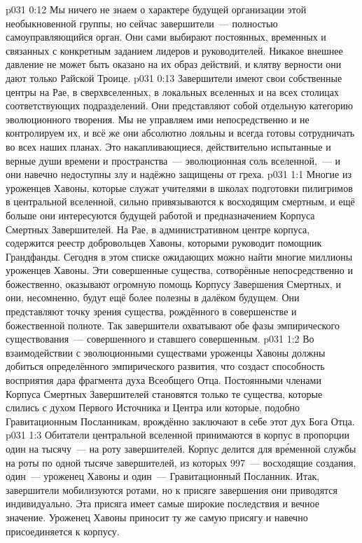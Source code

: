 \vs p031 0:12 Мы ничего не знаем о характере будущей организации этой необыкновенной группы, но сейчас завершители~--- полностью самоуправляющийся орган. Они сами выбирают постоянных, временных и связанных с конкретным заданием лидеров и руководителей. Никакое внешнее давление не может быть оказано на их образ действий, и клятву верности они дают только Райской Троице.
\vs p031 0:13 Завершители имеют свои собственные центры на Рае, в сверхвселенных, в локальных вселенных и на всех столицах соответствующих подразделений. Они представляют собой отдельную категорию эволюционного творения. Мы не управляем ими непосредственно и не контролируем их, и всё же они абсолютно лояльны и всегда готовы сотрудничать во всех наших планах. Это накапливающиеся, действительно испытанные и верные души времени и пространства~--- эволюционная соль вселенной,~--- и они навечно недоступны злу и надёжно защищены от греха.
\vs p031 1:1 Многие из уроженцев Хавоны, которые служат учителями в школах подготовки пилигримов в центральной вселенной, сильно привязываются к восходящим смертным, и ещё больше они интересуются будущей работой и предназначением Корпуса Смертных Завершителей. На Рае, в административном центре корпуса, содержится реестр добровольцев Хавоны, которыми руководит помощник Грандфанды. Сегодня в этом списке ожидающих можно найти многие миллионы уроженцев Хавоны. Эти совершенные существа, сотворённые непосредственно и божественно, оказывают огромную помощь Корпусу Завершения Смертных, и они, несомненно, будут ещё более полезны в далёком будущем. Они представляют точку зрения существа, рождённого в совершенстве и божественной полноте. Так завершители охватывают обе фазы эмпирического существования~--- совершенного и ставшего совершенным.
\vs p031 1:2 Во взаимодействии с эволюционными существами уроженцы Хавоны должны добиться определённого эмпирического развития, что создаст способность восприятия дара фрагмента духа Всеобщего Отца. Постоянными членами Корпуса Смертных Завершителей становятся только те существа, которые слились с духом Первого Источника и Центра или которые, подобно Гравитационным Посланникам, врождённо заключают в себе этот дух Бога Отца.
\vs p031 1:3 Обитатели центральной вселенной принимаются в корпус в пропорции один на тысячу~--- на роту завершителей. Корпус делится для вр\'еменной службы на роты по одной тысяче завершителей, из которых 997~--- восходящие создания, один~--- уроженец Хавоны и один~--- Гравитационный Посланник. Итак, завершители мобилизуются ротами, но к присяге завершения они приводятся индивидуально. Эта присяга имеет самые широкие последствия и вечное значение. Уроженец Хавоны приносит ту же самую присягу и навечно присоединяется к корпусу.
